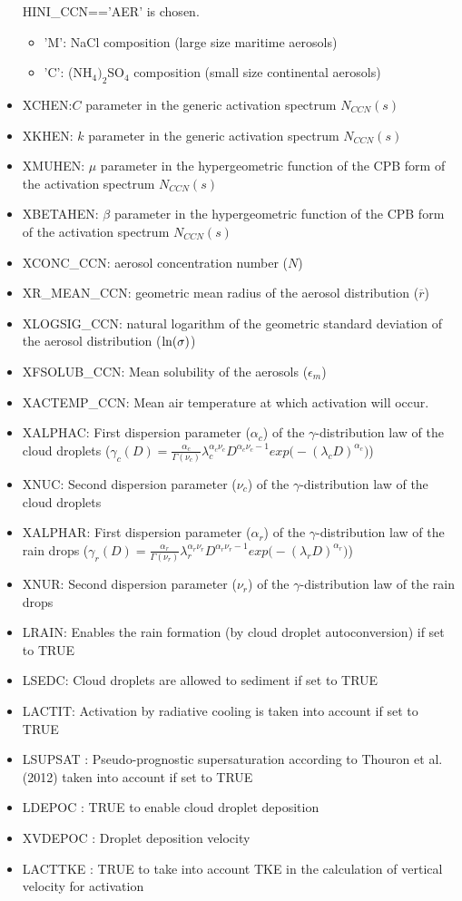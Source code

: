 \begin{itemize}
HINI\_CCN=='AER' is chosen.
\begin{itemize}
\item 'M': NaCl composition (large size maritime aerosols)
\item 'C': (NH$_4)_2$SO$_4$ composition (small size continental aerosols)
\end{itemize}
\item XCHEN:$C$ parameter  in the generic activation spectrum $N_{CCN}(s)$
\item XKHEN:  $k$ parameter in the generic activation spectrum $N_{CCN}(s)$
\item XMUHEN:  $\mu$ parameter in the hypergeometric function of the CPB form
of the activation spectrum $N_{CCN}(s)$
\item XBETAHEN:  $\beta$ parameter in the hypergeometric function of the CPB form
of the activation spectrum $N_{CCN}(s)$
\item XCONC\_CCN: aerosol concentration number ($N$)
\item XR\_MEAN\_CCN: geometric mean radius of the aerosol distribution ($\overline{r}$)
\item XLOGSIG\_CCN: natural logarithm of the geometric standard deviation of 
the aerosol distribution (${\rm ln}(\sigma)$)
\item XFSOLUB\_CCN: Mean solubility of the aerosols ($\epsilon_m$)
\item XACTEMP\_CCN: Mean air temperature at which activation will occur.
\item XALPHAC: First dispersion parameter ($\alpha_c$) of the 
$\gamma$-distribution law of the cloud droplets
($\gamma_c (D)=\frac{\displaystyle{\alpha_c}}{\displaystyle{\Gamma(\nu_c)}}
\lambda_c^{\alpha_c \nu_c} D ^{\alpha_c \nu_c -1} exp\big(-(\lambda_c D)^{\alpha_c}\big)$)
\item XNUC: Second dispersion parameter ($\nu_c$) of the $\gamma$-distribution
law of the cloud droplets
\item XALPHAR: First dispersion parameter ($\alpha_r$) of the 
$\gamma$-distribution law of the rain drops
($\gamma_r (D)=\frac{\displaystyle{\alpha_r}}{\displaystyle{\Gamma(\nu_r)}}
\lambda_r^{\alpha_r \nu_r} D ^{\alpha_r \nu_r -1} exp\big(-(\lambda_r D)^{\alpha_r}\big)$)
\item XNUR: Second dispersion parameter ($\nu_r$) of the $\gamma$-distribution
law of the rain drops
\item LRAIN: Enables the rain formation (by cloud droplet autoconversion) if set to TRUE
\item LSEDC: Cloud droplets are allowed to sediment if set to TRUE
\item LACTIT: Activation by radiative cooling is taken into account if set to  TRUE
\item LSUPSAT : Pseudo-prognostic supersaturation according to Thouron et al.(2012) taken into account if set to  TRUE
\item LDEPOC : TRUE to enable cloud droplet deposition
\item XVDEPOC : Droplet deposition velocity
\item LACTTKE : TRUE to take into account TKE in the calculation of vertical velocity for activation
\end{itemize}
